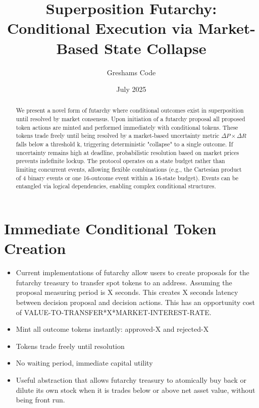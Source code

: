 \documentclass{article}
\title{Superposition Futarchy: Conditional Execution via Market-Based State Collapse}
\author[1]{Greshams Code}
\affil[1]{Founder, \href{https://govex.ai}{Govex.ai}}
\date{July 2025}
\begin{document}
\maketitle

\begin{abstract}
We present a novel form of futarchy where conditional outcomes exist in superposition until resolved by market consensus. Upon initiation of a futarchy proposal all proposed token actions are minted and performed immediately with conditional tokens. These tokens trade freely until being resolved by a market-based uncertainty metric $\Delta P \times \Delta R$ falls below a threshold k, triggering deterministic "collapse" to a single outcome. If uncertainty remains high at deadline, probabilistic resolution based on market prices prevents indefinite lockup.
The protocol operates on a state budget rather than limiting concurrent events, allowing flexible combinations (e.g., the Cartesian product of 4 binary events or one 16-outcome event within a 16-state budget). Events can be entangled via logical dependencies, enabling complex conditional structures.
\end{abstract}


\section{Immediate Conditional Token Creation}
\begin{itemize}
    \item Current implementations of futarchy allow users to create proposals for the futarchy treasury to transfer spot tokens to an address. Assuming the proposal measuring period is X seconds. This creates X seconds latency between decision proposal and decision actions. This has an opportunity cost of VALUE-TO-TRANSFER*X*MARKET-INTEREST-RATE.
    \item Mint all outcome tokens instantly: approved-X and rejected-X
   \item Tokens trade freely until resolution
   \item No waiting period, immediate capital utility
   \item Useful abstraction that allows futarchy treasury to atomically buy back or dilute its own stock when it is trades below or above net asset value, without being front run. 
\end{itemize}
\end{document}
